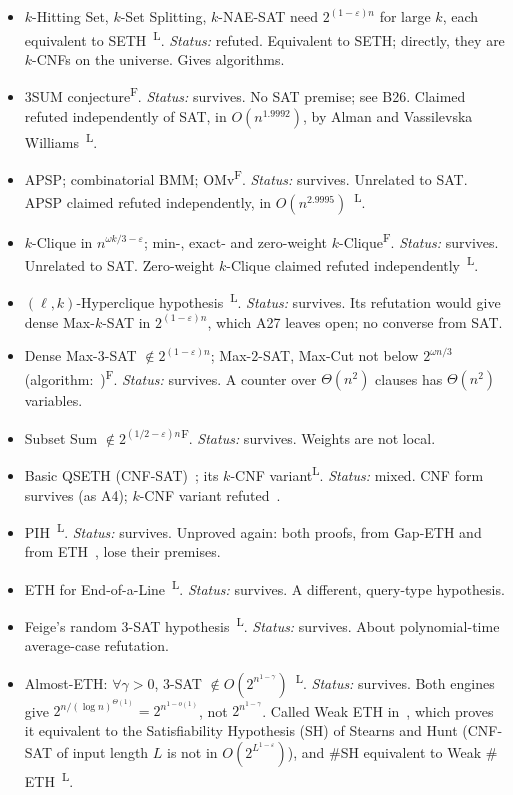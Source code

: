 \documentclass[10pt]{amsart}
\theoremstyle{plain}
\theoremstyle{definition}
\theoremstyle{remark}
\numberwithin{equation}{section}
\newcommand{\Lit}{\textsuperscript{L}}
\newcommand{\Fol}{\textsuperscript{F}}
\begin{document}
{\begin{itemize}[leftmargin=2.6em,itemsep=2pt]
\item[A22] $k$-Hitting Set, $k$-Set Splitting, $k$-NAE-SAT need $2^{(1-\varepsilon)n}$ for large $k$, each equivalent to SETH~\cite[Thm.~1.1]{CDLMNOPSW16}\Lit. \emph{Status:} refuted. Equivalent to SETH; directly, they are $k$-CNFs on the universe. Gives algorithms.
\item[A23] 3SUM conjecture\Fol. \emph{Status:} survives. No SAT premise; see B26. Claimed refuted independently of SAT, in $O(n^{1.9992})$, by Alman and Vassilevska Williams~\cite{AVW26}\Lit.
\item[A24] APSP; combinatorial BMM; OMv\Fol. \emph{Status:} survives. Unrelated to SAT. APSP claimed refuted independently, in $O(n^{2.9995})$~\cite{AVW26}\Lit.
\item[A25] $k$-Clique in $n^{\omega k/3-\varepsilon}$; min-, exact- and zero-weight $k$-Clique\Fol. \emph{Status:} survives. Unrelated to SAT. Zero-weight $k$-Clique claimed refuted independently~\cite{AVW26}\Lit.
\item[A26] $(\ell,k)$-Hyperclique hypothesis~\cite[Hyp.~1.4]{LVWW18}\Lit. \emph{Status:} survives. Its refutation would give dense Max-$k$-SAT in $2^{(1-\varepsilon)n}$, which A27 leaves open; no converse from SAT.
\item[A27] Dense Max-$3$-SAT $\notin2^{(1-\varepsilon)n}$; Max-$2$-SAT, Max-Cut not below $2^{\omega n/3}$ (algorithm:~\cite{Wil05})\Fol. \emph{Status:} survives. A counter over $\Theta(n^2)$ clauses has $\Theta(n^2)$ variables.
\item[A28] Subset Sum $\notin2^{(1/2-\varepsilon)n}$\Fol. \emph{Status:} survives. Weights are not local.
\item[A29] Basic QSETH (CNF-SAT)~\cite{BPS19}; its $k$-CNF variant\Lit. \emph{Status:} mixed. CNF form survives (as A4); $k$-CNF variant refuted~\cite[\S6.2, entry~23]{TulsyanQ26}.
\item[A30] PIH~\cite{LRSZ20}\Lit. \emph{Status:} survives. Unproved again: both proofs, from Gap-ETH and from ETH~\cite{GLRSW24}, lose their premises.
\item[A31] ETH for End-of-a-Line~\cite{Rub16}\Lit. \emph{Status:} survives. A different, query-type hypothesis.
\item[A32] Feige's random $3$-SAT hypothesis~\cite{Feige02}\Lit. \emph{Status:} survives. About polynomial-time average-case refutation.
\item[A33] Almost-ETH: $\forall\gamma>0$, $3$-SAT $\notin O(2^{n^{1-\gamma}})$~\cite{Man26}\Lit. \emph{Status:} survives. Both engines give $2^{n/(\log n)^{\Theta(1)}}=2^{n^{1-o(1)}}$, not $2^{n^{1-\gamma}}$. Called Weak ETH in~\cite{MIT26}, which proves it equivalent to the Satisfiability Hypothesis (SH) of Stearns and Hunt (CNF-SAT of input length $L$ is not in $O(2^{L^{1-\varepsilon}})$), and $\#$SH equivalent to Weak $\#$ETH~\cite[Thm.~2.4]{MIT26}\Lit.

\end{itemize}}
\end{document}
